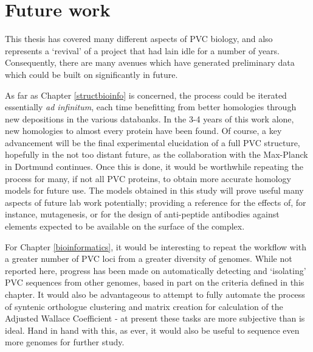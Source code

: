 \chapter{Future work}\label{Discussion}

This thesis has covered many different aspects of PVC biology, and also represents a `revival' of a project that had lain idle for a number of years. Consequently, there are many avenues which have generated preliminary data which could be built on significantly in future.

As far as Chapter \ref{structbioinfo} is concerned, the process could be iterated essentially \emph{ad infinitum}, each time benefitting from better homologies through new depositions in the various databanks. In the 3-4 years of this work alone, new homologies to almost every protein have been found. Of course, a key advancement will be the final experimental elucidation of a full PVC structure, hopefully in the not too distant future, as the collaboration with the Max-Planck in Dortmund continues. Once this is done, it would be worthwhile repeating the process for many, if not all PVC proteins, to obtain more accurate homology models for future use. The models obtained in this study will prove useful many aspects of future lab work potentially; providing a reference for the effects of, for instance, mutagenesis, or for the design of anti-peptide antibodies against elements expected to be available on the surface of the complex.

For Chapter \ref{bioinformatics}, it would be interesting to repeat the workflow with a greater number of PVC loci from a greater diversity of genomes. While not reported here, progress has been made on automatically detecting and `isolating' PVC sequences from other genomes, based in part on the criteria defined in this chapter. It would also be advantageous to attempt to fully automate the process of syntenic orthologue clustering and matrix creation for calculation of the Adjusted Wallace Coefficient - at present these tasks are more subjective than is ideal. Hand in hand with this, as ever, it would also be useful to sequence even more genomes for further study.

